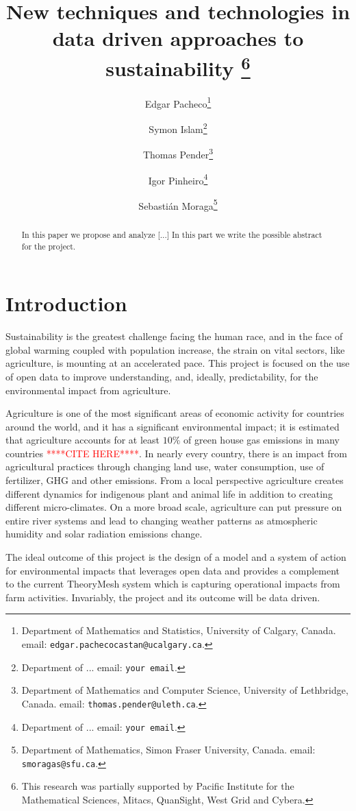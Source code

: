 \documentclass[11pt]{article}
\title{New techniques and technologies in data driven approaches to sustainability
\thanks{This research was 
partially supported by  Pacific Institute for the Mathematical Sciences, Mitacs, QuanSight, West Grid and Cybera.}}
\author{{\sc Edgar Pacheco}\thanks{Department of Mathematics and Statistics, University of Calgary, Canada.
email: {\tt edgar.pachecocastan@ucalgary.ca}.}
\and
{\sc Symon Islam}\thanks{Department of ...
email: {\tt your email}.}
\and
{\sc Thomas Pender}\thanks{Department of Mathematics and Computer Science, University of Lethbridge, Canada.
email: {\tt thomas.pender@uleth.ca}.}
\and
{\sc Igor Pinheiro}\thanks{Department of ...
email: {\tt your email}.}
\and
{\sc Sebasti\'an Moraga}\thanks{ Department of Mathematics, Simon Fraser University, Canada.
email: {\tt smoragas@sfu.ca}.}}
\date{}
\numberwithin{equation}{section}
\numberwithin{figure}{section}
\newcommand{\rred}[1]{\textcolor{red}{#1}}
\newcommand{\ccite}{\rred{****CITE HERE****}}
\begin{document}
\maketitle

\begin{abstract}
\noindent
In this paper we propose and analyze [...] In this part we write the possible abstract for the project.

\end{abstract}

\smallskip\noindent

                                                  

\section{Introduction}\label{introduction}

Sustainability is the greatest challenge facing the human race, and in the face of global warming coupled with population increase, the strain on vital sectors, like agriculture, is mounting at an accelerated pace. This project is focused on the use of open data to improve understanding, and, ideally, predictability, for the environmental impact from agriculture. 

Agriculture is one of the most significant areas of economic activity for countries around the world, and it has a significant environmental impact; it is estimated that agriculture accounts for at least $10\%$ of green house gas emissions in many countries \ccite. In nearly every country, there is an impact from agricultural practices through changing land use, water consumption, use of fertilizer, GHG and other emissions. From a local perspective agriculture creates different dynamics for indigenous plant and animal life in addition to creating different micro-climates. On a more broad scale, agriculture can put pressure on entire river systems and lead to changing weather patterns as atmospheric humidity and solar radiation emissions change.

The ideal outcome of this project is the design of a model and a system of action for environmental impacts that leverages open data and provides a complement to the current TheoryMesh system which is capturing operational impacts from farm activities. Invariably, the project and its outcome will be data driven.
\end{document}
